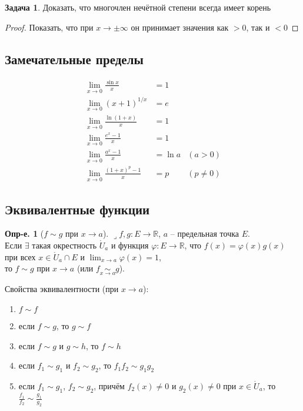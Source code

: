 \documentclass[a4paper,12pt]{article}
\numberwithin{figure}{section}
\theoremstyle{definition}
\newtheorem{definition}{Опр-е.}[section]
\newtheorem{problem}{Задача}[section]
\def\DS{\displaystyle}
\def\R{\mathbb{R}}
\def\on{\!:}
\def\ringU{\mathring{U}}
\def\lets{{\huge$\lrcorner$}\space}
\begin{document}
\begin{problem}Доказать, что многочлен нечётной степени всегда имеет корень\end{problem}
\begin{proof}Показать, что при $x\to\pm\infty$ он принимает значения как $>0$, так и $<0$\end{proof}


\subsection{Замечательные пределы}

\begin{align*}
	   \lim_{x\to 0} \frac{\sin x}x &= 1
	\\ \lim_{x\to 0} \left(x+1\right)^{1/x} &= e
	\\ \lim_{x\to 0} \frac{\ln(1+x)}x &= 1
	\\ \lim_{x\to 0} \frac{e^x-1}x &= 1
	\\ \lim_{x\to 0} \frac{a^x-1}x &= \ln a    &(a>0)
	\\ \lim_{x\to 0} \frac{(1+x)^p-1}x &= p   &(p \ne 0)
\end{align*}


\subsection{Эквивалентные функции}

\begin{definition}[$f \sim g$ при $x \to a$]
	\lets $f,g\on E\to \R$, $a$ -- предельная точка $E$. \\
	Если $\exists$ такая окрестность $\ringU_a$ и функция $\varphi\on E\to\R$,
	что $f(x)=\varphi(x)g(x)$ при всех $x\in\ringU_a\cap E$
	и $\DS \lim_{x\to a}\varphi(x)=1$,\\
	то $f \sim g$ при $x\to a$ (или $\DS f \underset{x\to a}{\sim} g$).
\end{definition}

Свойства эквивалентности (при $x \to a$): \begin{enumerate}
	\item $f \sim f$
	\item если $f \sim g$, то $g \sim f$
	\item если $f \sim g$ и $g \sim h$, то $f \sim h$
	\item если $f_1 \sim g_1$ и $f_2 \sim g_2$, то $f_1 f_2 \sim g_1 g_2$
	\item если $f_1 \sim g_1$, $f_2 \sim g_2$, причём
		  $f_2(x)\ne0$ и $g_2(x)\ne0$ при $x\in \ringU_a$,
		  то $\DS \frac{f_1}{f_2} \sim \frac{g_1}{g_2}$
\end{enumerate}
\end{document}
